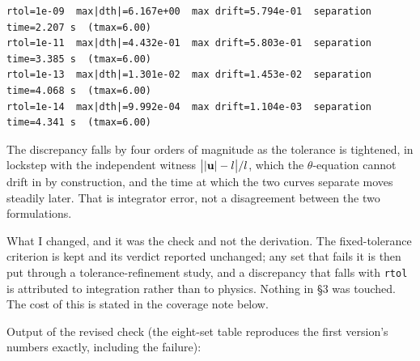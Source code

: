 \documentclass[11pt,a4paper]{article}
\providecommand{\passthrough}[1]{#1}
\begin{document}
\begin{lstlisting}
rtol=1e-09  max|dth|=6.167e+00  max drift=5.794e-01  separation time=2.207 s  (tmax=6.00)
rtol=1e-11  max|dth|=4.432e-01  max drift=5.803e-01  separation time=3.385 s  (tmax=6.00)
rtol=1e-13  max|dth|=1.301e-02  max drift=1.453e-02  separation time=4.068 s  (tmax=6.00)
rtol=1e-14  max|dth|=9.992e-04  max drift=1.104e-03  separation time=4.341 s  (tmax=6.00)
\end{lstlisting}

The discrepancy falls by four orders of magnitude as the tolerance is tightened,
in lockstep with the independent witness \(\bigl||{\bf u}|-l\bigr|/l\), which the
\(\theta\)-equation cannot drift in by construction, and the time at which the two
curves separate moves steadily later. That is integrator error, not a
disagreement between the two formulations.

What I changed, and it was the check and not the derivation. The
fixed-tolerance criterion is kept and its verdict reported unchanged; any set
that fails it is then put through a tolerance-refinement study, and a
discrepancy that falls with \passthrough{\lstinline!rtol!} is attributed to integration rather than to
physics. Nothing in §3 was touched. The cost of this is stated in the coverage
note below.

Output of the revised check (the eight-set table reproduces the first version's
numbers exactly, including the failure):
\end{document}
